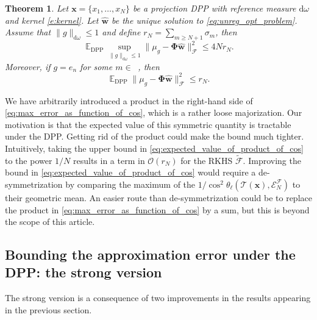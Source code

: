 \documentclass[twoside,11pt]{book}
\newtheorem{theorem}{Theorem}
\numberwithin{theorem}{chapter}
\numberwithin{definition}{chapter}
\numberwithin{proposition}{chapter}
\numberwithin{corollary}{chapter}
\numberwithin{example}{chapter}
\numberwithin{lemma}{chapter}
\DeclareMathOperator{\DPP}{\mathrm{DPP}}
\DeclareMathOperator{\EX}{\mathbb{E}}
\DeclareMathOperator{\Ns}{\mathbb{N}^{*}}
\begin{document}
\begin{theorem}\label{thm:main_theorem_refined}
Let $\bm{x} = \{x_{1}, \dots , x_{N}\}$ be a projection DPP with reference measure $\mathrm{d}\omega$ and kernel \eqref{e:kernel}. Let $\hat{\bm{w}}$ be the unique solution to \eqref{eq:unreg_opt_problem}. Assume that $\|g\|_{\mathrm{d}\omega} \leq 1$ and define $r_{N} = \sum\limits_{m \geq N+1} \sigma_{m}$, then
\begin{equation}\label{eq:main_result_refined}
\EX_{\DPP} \sup\limits_{\|g\|_{\mathrm{d}\omega} \leq 1}\|\mu_{g} - \bm{\Phi}\hat{\bm{w}}\|_{\mathcal{F}}^{2}  \leq 4 Nr_{N}.
\end{equation}
Moreover, if $g = e_{n}$ for some $m \in \Ns$, then
\begin{equation}\label{eq:main_result_refined_eigfunction}
\EX_{\DPP} \|\mu_{g} - \bm{\Phi}\hat{\bm{w}}\|_{\mathcal{F}}^{2}  \leq r_{N}.
\end{equation}
\end{theorem}



We have arbitrarily introduced a product in the right-hand side of \eqref{eq:max_error_as_function_of_cos}, which is a rather loose majorization. Our motivation is that the expected value of this symmetric quantity is tractable under the DPP. Getting rid of the product could make the bound much tighter. Intuitively, taking the upper bound in \eqref{eq:expected_value_of_product_of_cos} to the power $1/N$ results in a term in $\mathcal{O}(r_{N})$ for the RKHS $\tilde{\mathcal{F}}$. Improving the bound in \eqref{eq:expected_value_of_product_of_cos} would require a de-symmetrization by comparing the maximum of the $1/\cos^{2} \theta_{\ell}(\mathcal{T}(\bm{x}),\mathcal{E}^{\mathcal{F}}_{N})$ to their geometric mean.
An easier route than de-symmetrization could be to replace the product in \eqref{eq:max_error_as_function_of_cos} by a sum, but this is beyond the scope of this article.


\subsection{Bounding the approximation error under the DPP: the strong version}
The strong version is a consequence of two improvements in the results appearing in the previous section.
\end{document}
